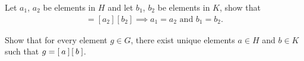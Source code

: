 \begin{qbox}
  \label{q:uniquenessOfDigits}
  Let $a_1$, $a_2$ be elements in $H$ and let $b_1$, $b_2$ be elements in $K$, show that
\begin{align*}
    [a_1][b_1] = [a_2][b_2] \implies a_1 = a_2 \mbox{ and } b_1 = b_2.
\end{align*}
\end{qbox}

\begin{qbox}
  \label{q:existenceOfDigits}
  Show that for every element $g \in G$, there exist unique elements $a \in H$ and $ b \in K $ such that $g = \left[\: a \:\right]\left[\: b \:\right]$.
\end{qbox}
